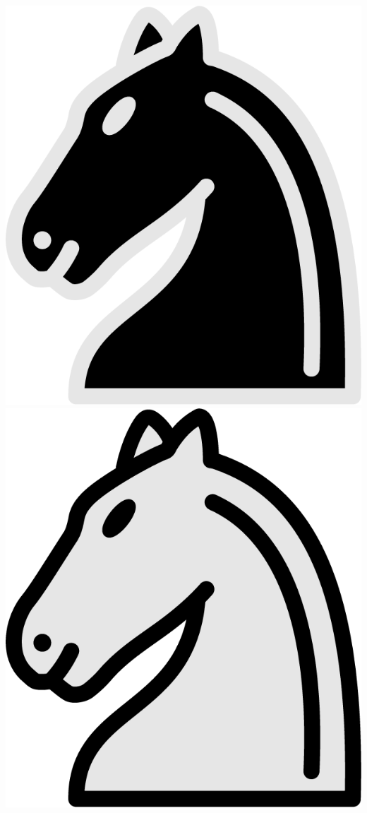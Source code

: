 \documentclass{article}
\begin{document}
\begin{itemize}
    \begin{center}
    	\includegraphics[scale=0.1]{image13.png}
    	\includegraphics[scale=0.1]{image10.png}

\end{center}
\end{itemize}
\end{document}
